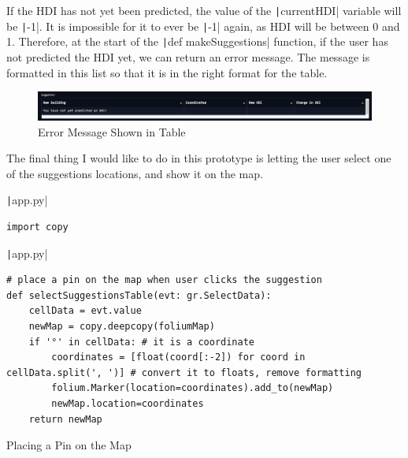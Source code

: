\documentclass[12pt]{report}
\newcommand{\pil}[1]{\protect\texttt|#1|}
\begin{document}
If the HDI has not yet been predicted, the value of the \pil{currentHDI} variable will be \pil{-1}. It is impossible for it to ever be \pil{-1} again, as HDI will be between 0 and 1. Therefore, at the start of the \pil{def makeSuggestions} function, if the user has not predicted the HDI yet, we can return an error message. The message is formatted in this list so that it is in the right format for the table.

\begin{figure}[H]
\centering
\includegraphics[width=14cm]{ss13.4.png}
\caption{Error Message Shown in Table}\label{fig:ss13.4}
\end{figure}

\begin{center}
\end{center}

The final thing I would like to do in this prototype is letting the user select one of the suggestions locations, and show it on the map.

\begin{listing}[H]
\pil{app.py}
\begin{verbatim}
import copy
\end{verbatim}
\pil{app.py}
\begin{verbatim}
# place a pin on the map when user clicks the suggestion
def selectSuggestionsTable(evt: gr.SelectData):
    cellData = evt.value
    newMap = copy.deepcopy(foliumMap)
    if '°' in cellData: # it is a coordinate
        coordinates = [float(coord[:-2]) for coord in cellData.split(', ')] # convert it to floats, remove formatting
        folium.Marker(location=coordinates).add_to(newMap)
        newMap.location=coordinates
    return newMap
\end{verbatim}
\caption{Placing a Pin on the Map}\label{cs:placePinOnMap}
\end{listing}
\end{document}
